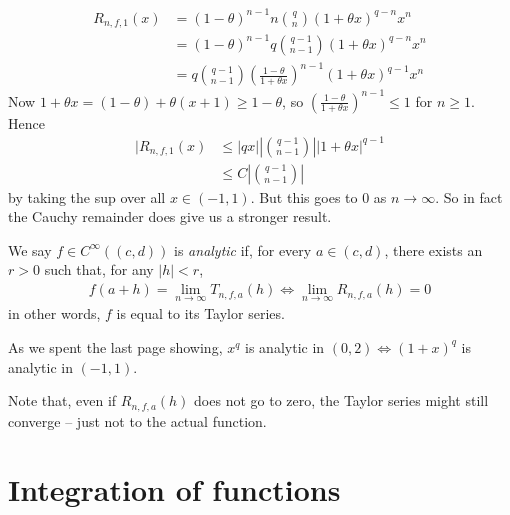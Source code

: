 \documentclass{../../template/note}
\begin{document}
\begin{example*}
\begin{itemize}
\begin{align*}
                R_{n,f,1}(x) &= (1-\theta)^{n-1}n\binom q n (1+\theta x)^{q-n}x^n \\
                &= (1-\theta)^{n-1}q\binom {q-1}{n-1} (1+\theta x)^{q-n}x^n \\
                &= q \binom{q-1}{n-1} \left(\frac{1-\theta}{1+\theta x}\right)^{n-1} (1+\theta x)^{q-1}x^n
            \end{align*}
            Now \(1+\theta x = (1-\theta) + \theta(x+1) \geq 1-\theta\), so \(\left(\frac{1-\theta}{1+\theta x}\right)^{n-1} \leq 1\) for \(n \geq 1\). Hence
            \begin{align*}
                |R_{n,f,1}(x) &\leq |qx|\left|\binom{q-1}{n-1}\right||1+\theta x|^{q-1} \\
                &\leq C\left|\binom{q-1}{n-1}\right|
            \end{align*}
            by taking the sup over all \(x \in (-1, 1)\). But this goes to 0 as \(n \to \infty\). So in fact the Cauchy remainder does give us a stronger result.    
        \end{itemize}
    \end{example*}
    
    \begin{definition}
        We say \(f \in C^\infty((c, d))\) is \emph{analytic} if, for every \(a \in (c, d)\), there exists an \(r > 0\) such that, for any \(|h| < r\), 
        \begin{align*}
            f(a+h) = \lim_{n \to \infty} T_{n, f, a}(h) \iff \lim_{n \to \infty} R_{n,f,a}(h) = 0
        \end{align*}
        in other words, \(f\) is equal to its Taylor series.
    \end{definition}
    
    \begin{example*}
        As we spent the last page showing, \(x^q\) is analytic in \((0, 2) \iff (1+x)^q\) is analytic in \((-1, 1)\).
    \end{example*}
    
    \begin{remark*}
        Note that, even if \(R_{n,f,a}(h)\) does not go to zero, the Taylor series might still converge -- just not to the actual function.
    \end{remark*}
    
    \section{Integration of functions}
\end{document}
